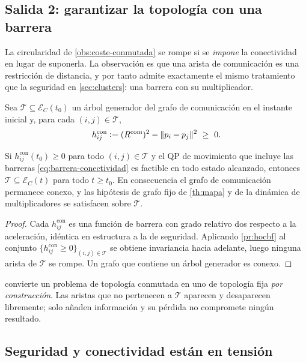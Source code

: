 \subsection{Salida 2: garantizar la topología con una barrera}

La circularidad de \cref{obs:coste-conmutada} se rompe si se \emph{impone} la
conectividad en lugar de suponerla. La observación es que una arista de
comunicación es una restricción de distancia, y por tanto admite exactamente el
mismo tratamiento que la seguridad en \cref{sec:clusters}: una barrera con su
multiplicador.

Sea $\mathcal T\subseteq\mathcal E_C(t_0)$ un árbol generador del grafo de
comunicación en el instante inicial y, para cada $(i,j)\in\mathcal T$,
\begin{equation}
  h^{\mathrm{con}}_{ij}
  \vcentcolon= (R^{\mathrm{com}})^2-\|p_i-p_j\|^2\ \ge\ 0 .
  \label{eq:barrera-conectividad}
\end{equation}

\begin{teorema}
\label{th:topologia-garantizada}
Si $h^{\mathrm{con}}_{ij}(t_0)\ge0$ para todo $(i,j)\in\mathcal T$ y el QP de
movimiento que incluye las barreras \eqref{eq:barrera-conectividad} es factible
en todo estado alcanzado, entonces $\mathcal T\subseteq\mathcal E_C(t)$ para
todo $t\ge t_0$. En consecuencia el grafo de comunicación permanece conexo, y
las hipótesis de grafo fijo de \cref{th:mapa} y de la dinámica de
multiplicadores se satisfacen sobre $\mathcal T$.
\end{teorema}

\begin{proof}
Cada $h^{\mathrm{con}}_{ij}$ es una función de barrera con grado relativo dos
respecto a la aceleración, idéntica en estructura a la de seguridad. Aplicando
\cref{pr:hocbf} al conjunto $\{h^{\mathrm{con}}_{ij}\ge0\}_{(i,j)\in\mathcal T}$
se obtiene invariancia hacia adelante, luego ninguna arista de $\mathcal T$ se
rompe. Un grafo que contiene un árbol generador es conexo.
\end{proof}

 convierte un problema de topología conmutada en
uno de topología fija \emph{por construcción}. Las aristas que no pertenecen a
$\mathcal T$ aparecen y desaparecen libremente; solo añaden información y su
pérdida no compromete ningún resultado.

\subsection{Seguridad y conectividad están en tensión}

